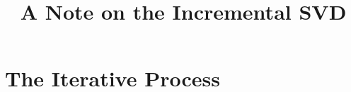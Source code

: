 \documentclass[11pt,a4paper]{article}
\newcommand{\0}{\M{0}}
\newenvironment{changemargin}[2]{%
  \begin{list}{}{%
      \setlength{\topsep}{0pt}%
      \setlength{\leftmargin}{#1}%
      \setlength{\rightmargin}{#2}%
      \setlength{\listparindent}{\parindent}%
      \setlength{\itemindent}{\parindent}%
      \setlength{\parsep}{\parskip}%
    }%
  \item[]}
  {\end{list}}
\newenvironment{keywords}{%
  \begingroup
  \def\and{\unskip\space\textperiodcentered\space\ignorespaces}
  \begin{changemargin}{\leftmargin}{\leftmargin}
    \small\noindent\emph{Keywords}:}
  {\end{changemargin}
  \endgroup
}
\begin{document}
\title{A Note on the Incremental SVD}

\date{}

\author{}


\maketitle





\section{The Iterative Process}
\end{document}
